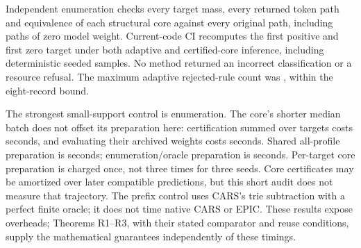 \documentclass[11pt,a4paper]{article}
\begin{document}

\begin{table}[ht]
\centering
\AdaptiveAuditTable
\caption{All \AdaptiveTargets{} label vectors, \AdaptiveSeeds{} seeds:
\AdaptiveRows{} rows and \AdaptivePrograms{} original-token programs.
\AdaptivePositiveTargets{} labels have positive mass. Batch time is the
median over positive rows, each requesting \AdaptiveSamples{} samples;
shared preparation is additional.}
\end{table}

Independent enumeration checks every target mass, every returned token path
and equivalence of each structural core against every original path, including
paths of zero model weight. Current-code CI recomputes the first positive and
first zero target under both adaptive and certified-core inference, including
deterministic seeded samples. No method returned an incorrect classification
or a resource refusal. The maximum adaptive rejected-rule count was
\AdaptiveMaxReject{}, within the eight-record bound.

\begin{samepage}
The strongest small-support control is enumeration. The core's shorter
median batch does not offset its preparation here: certification summed over
targets costs \AdaptiveCorePrep{} seconds, and evaluating their archived
weights costs \AdaptiveCoreEval{} seconds. Shared all-profile preparation is
\AdaptiveEagerPrep{} seconds; enumeration/oracle preparation is
\AdaptiveEnumPrep{} seconds. Per-target core preparation is charged once,
not three times for three seeds. Core certificates may be amortized over later
compatible predictions, but this short audit does not measure that trajectory.
The prefix control uses CARS's trie subtraction with a perfect finite oracle;
it does not time native CARS or EPIC. These results expose overheads;
Theorems R1--R3, with their stated comparator and reuse conditions, supply the
mathematical guarantees independently of these timings.
\par
\end{samepage}



\end{document}
